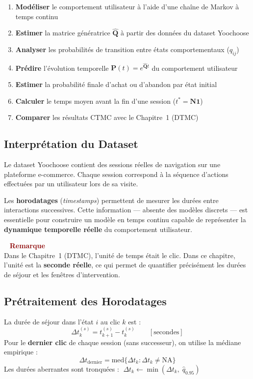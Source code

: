 \documentclass[11pt,a4paper]{article}
\newenvironment{warnbox}{%
  \vspace{3pt}\begin{framed}
  \noindent{\color{DarkRed}\rule{0.3cm}{3pt}}~%
  \textcolor{DarkRed}{\textbf{Remarque}}\\[3pt]}
  {\end{framed}\vspace{3pt}}
\newcommand{\mat}[1]{\mathbf{#1}}
\begin{document}
\begin{enumerate}[leftmargin=2cm,itemsep=4pt]
  \item \textbf{Modéliser} le comportement utilisateur à l'aide d'une chaîne de Markov à temps continu
  \item \textbf{Estimer} la matrice génératrice $\hat{\mat{Q}}$ à partir des données du dataset Yoochoose
  \item \textbf{Analyser} les probabilités de transition entre états comportementaux ($\hat{q}_{ij}$)
  \item \textbf{Prédire} l'évolution temporelle $\mat{P}(t) = e^{\hat{\mat{Q}}t}$ du comportement utilisateur
  \item \textbf{Estimer} la probabilité finale d'achat ou d'abandon par état initial
  \item \textbf{Calculer} le temps moyen avant la fin d'une session ($t^* = \mat{N}\mathbf{1}$)
  \item \textbf{Comparer} les résultats CTMC avec le Chapitre~1 (DTMC)
\end{enumerate}

\subsection{Interprétation du Dataset}

Le dataset Yoochoose contient des sessions réelles de navigation sur une plateforme e-commerce.
Chaque session correspond à la séquence d'actions effectuées par un utilisateur lors de sa visite.

Les \textbf{horodatages} (\textit{timestamps}) permettent de mesurer les durées entre interactions
successives. Cette information --- absente des modèles discrets --- est essentielle pour construire
un modèle en temps continu capable de représenter la \textbf{dynamique temporelle réelle} du
comportement utilisateur.

\begin{warnbox}
Dans le Chapitre~1 (DTMC), l'unité de temps était le clic. Dans ce chapitre, l'unité est la
\textbf{seconde réelle}, ce qui permet de quantifier précisément les durées de séjour et les
fenêtres d'intervention.
\end{warnbox}

\subsection{Prétraitement des Horodatages}

La durée de séjour dans l'état $i$ au clic $k$ est :
\[
\Delta t_k^{(s)} = t_{k+1}^{(s)} - t_k^{(s)} \qquad [\text{secondes}]
\]
Pour le \textbf{dernier clic} de chaque session (sans successeur), on utilise la médiane empirique :
\[
\Delta t_{\text{dernier}} = \mathrm{med}\bigl\{\Delta t_k : \Delta t_k \neq \mathrm{NA}\bigr\}
\]
Les durées aberrantes sont tronquées : $\;\Delta t_k \leftarrow \min(\Delta t_k,\; \hat{q}_{0.95})$
\end{document}
